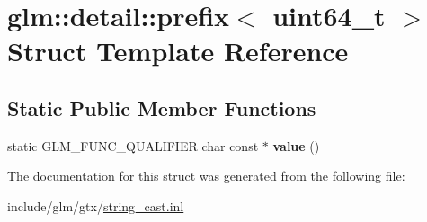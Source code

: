 \hypertarget{structglm_1_1detail_1_1prefix_3_01uint64__t_01_4}{}\section{glm\+:\+:detail\+:\+:prefix$<$ uint64\+\_\+t $>$ Struct Template Reference}
\label{structglm_1_1detail_1_1prefix_3_01uint64__t_01_4}
\subsection*{Static Public Member Functions}
\begin{DoxyCompactItemize}
\item 
\mbox{\label{structglm_1_1detail_1_1prefix_3_01uint64__t_01_4_a70571c67b5d9aadad2b0d3ea937fa392}} 
static G\+L\+M\+\_\+\+F\+U\+N\+C\+\_\+\+Q\+U\+A\+L\+I\+F\+I\+ER char const  $\ast$ {\bfseries value} ()
\end{DoxyCompactItemize}


The documentation for this struct was generated from the following file\+:\begin{DoxyCompactItemize}
\item 
include/glm/gtx/\hyperlink{string__cast_8inl}{string\+\_\+cast.\+inl}\end{DoxyCompactItemize}
